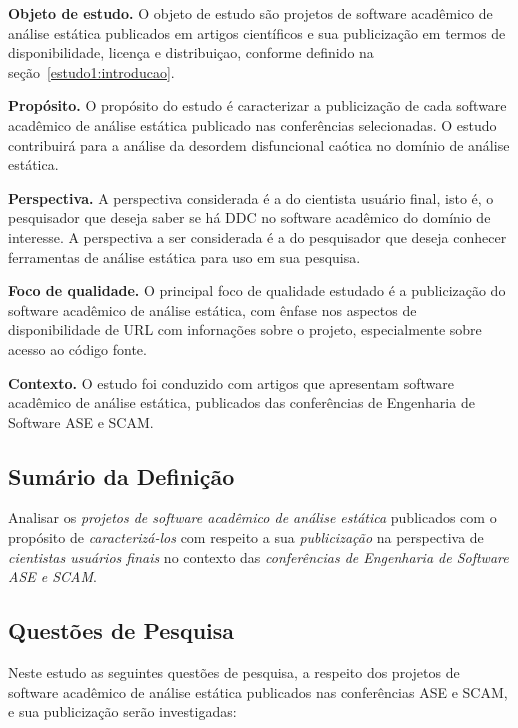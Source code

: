 \begin{description}
  \item{\bf Objeto de estudo.}
     O objeto de estudo são projetos de software acadêmico de análise estática
     publicados em artigos científicos e sua publicização em termos de
     disponibilidade, licença e distribuiçao, conforme definido na
     seção~\ref{estudo1:introducao}.
  \item{\bf Propósito.}
    O propósito do estudo é caracterizar a publicização de cada software
    acadêmico de análise estática publicado nas conferências selecionadas.
    O estudo contribuirá para a análise da desordem disfuncional caótica no
    domínio de análise estática.
  \item{\bf Perspectiva.}
    A perspectiva considerada é a do cientista usuário final, isto é, o
    pesquisador que deseja saber se há DDC no software acadêmico do domínio de
    interesse. A perspectiva a ser considerada é a do pesquisador que deseja
    conhecer ferramentas de análise estática para uso em sua pesquisa.
  \item{\bf Foco de qualidade.}
    O principal foco de qualidade estudado é a publicização do software
    acadêmico de análise estática, com ênfase nos aspectos de disponibilidade
    de URL com infornações sobre o projeto, especialmente sobre acesso ao
    código fonte.
  \item{\bf Contexto.}
    O estudo foi conduzido com artigos que apresentam software acadêmico de
    análise estática, publicados das conferências de Engenharia de Software ASE
    e SCAM.
\end{description}

\subsection{Sumário da Definição}

Analisar os \textit{projetos de software acadêmico de análise estática} publicados
com o propósito de \textit{caracterizá-los} 
com respeito a sua \textit{publicização}
na perspectiva de \textit{cientistas usuários finais}
no contexto das \textit{conferências de Engenharia de Software ASE e SCAM}.

\subsection{Questões de Pesquisa}

Neste estudo as seguintes questões de pesquisa, a respeito dos projetos de
software acadêmico de análise estática publicados nas conferências ASE e SCAM,
e sua publicização serão investigadas:

